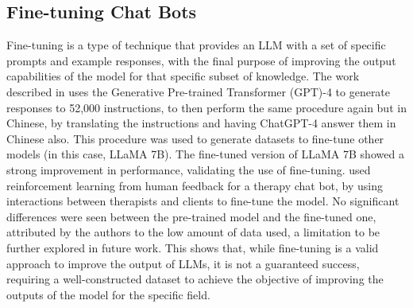 \documentclass[sigconf]{acmart}
\begin{document}
\subsection{Fine-tuning Chat Bots}
Fine-tuning is a type of technique that provides an LLM with a set of specific prompts and example responses, with the final purpose of improving the output capabilities of the model for that specific subset of knowledge. The work described in \cite{Peng23} uses the Generative Pre-trained Transformer (GPT)-4 to generate responses to 52,000 instructions, to then perform the same procedure again but in Chinese, by translating the instructions and having ChatGPT-4 answer them in Chinese also. This procedure was used to generate datasets to fine-tune other models (in this case, LLaMA 7B). The fine-tuned version of LLaMA 7B showed a strong improvement in performance, validating the use of fine-tuning. \cite{Bill23} used reinforcement learning from human feedback for a therapy chat bot, by using interactions between therapists and clients to fine-tune the model. No significant differences were seen between the pre-trained model and the fine-tuned one, attributed by the authors to the low amount of data used, a limitation to be further explored in future work. This shows that, while fine-tuning is a valid approach to improve the output of LLMs, it is not a guaranteed success, requiring a well-constructed dataset to achieve the objective of improving the outputs of the model for the specific field.
\end{document}
